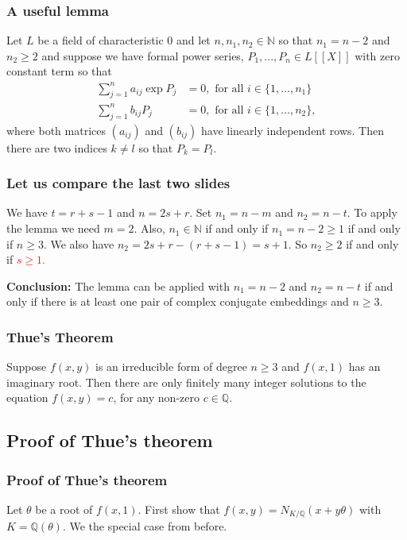 \documentclass{beamer}
\newcommand{\mbb}[1]{\mathbb{#1}}
\numberwithin{equation}{section}
\begin{document}
\begin{frame}
	\frametitle{A useful lemma}
	Let $L$ be a field of characteristic 0 and let $n,n_1,n_2 \in \mbb N$ so that $n_1 = n - 2$ and $n_2 \geq 2$ and suppose we have formal power series, $P_1, ..., P_n \in L[[X]]$ with zero constant term so that
	\begin{align*}
    	\sum_{j = 1}^n a_{ij} \exp P_j & = 0, \text{ for all } i \in \{1, ..., n_1\}  \\
    	\sum_{j = 1}^n b_{ij} P_j  	& = 0, \text{ for all } i \in \{1, ..., n_2\},
	\end{align*}
	where both matrices $(a_{ij})$ and $(b_{ij})$ have linearly independent rows. Then there are two indices $k \neq l$ so that $P_k = P_l$.
\end{frame}

\begin{frame}
	\frametitle{Let us compare the last two slides}
	We have $t = r + s - 1$ and $n = 2s + r$. Set $n_1 = n-m$ and $n_2 = n-t$. To apply the lemma we need $m = 2$. Also, $n_1 \in \mbb N$ if and only if $n_1 = n-2 \geq 1$ if and only if $n \geq 3$. We also have $n_2 = 2s + r - (r + s - 1) = s + 1$. So $n_2 \geq 2$ if and only if \textcolor{red}{$s \geq 1$.}

	\vspace{\baselineskip}
	\textbf{Conclusion:} The lemma can be applied with $n_1 = n-2$ and $n_2 = n - t$ if and only if there is at least one pair of complex conjugate embeddings and $n \geq 3$.

\end{frame}

\begin{frame}
	\frametitle{Thue's Theorem}	
	\begin{theorem}[Thue]
		Suppose $f(x,y)$ is an irreducible form of degree $n \geq 3$ and $f(x,1)$ has an imaginary root. Then there are only finitely many integer solutions to the equation $f(x,y) = c$, for any non-zero $c \in \mbb{Q}$.
	\end{theorem}
\end{frame}
\subsection{Proof of Thue's theorem}
\begin{frame}
	\frametitle{Proof of Thue's theorem}
	Let $\theta$ be a root of $f(x,1)$. First show that $f(x, y) = N_{K / \mbb Q}(x + y \theta)$ with $K = \mbb Q(\theta)$. We the special case from before. %
\end{frame}
\end{document}

